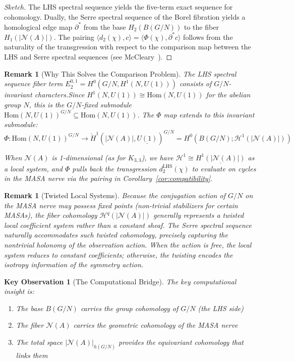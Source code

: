 \documentclass[11pt]{article}
\newtheorem{remark}[theorem]{Remark}
\newtheorem{keyobservation}[theorem]{Key Observation}
\begin{document}
\begin{proof}[Sketch]
The LHS spectral sequence yields the five-term exact sequence for cohomology. Dually, the Serre spectral sequence of the Borel fibration yields a homological edge map $\partial^*$ from the base $H_2(B(G/N))$ to the fiber $H_1(|\mathcal{N}(A)|)$. The pairing $\langle d_2(\chi), c \rangle = \langle \Phi(\chi), \partial^* c \rangle$ follows from the naturality of the transgression with respect to the comparison map between the LHS and Serre spectral sequences (see McCleary~\cite[Chapter 5]{McCleary2001}).
\end{proof}

\begin{remark}[Why This Solves the Comparison Problem]\label{rem:comparison-solved}
The LHS spectral sequence fiber term $E_2^{0,1} = H^0(G/N, H^1(N, U(1)))$ consists of $G/N$-invariant characters.\linebreak Since $H^1(N, U(1)) \cong \mathrm{Hom}(N, U(1))$ for the abelian group $N$, this is the $G/N$-fixed submodule $\mathrm{Hom}(N, U(1))^{G/N} \subseteq \mathrm{Hom}(N, U(1))$. The $\Phi$ map extends to this invariant submodule:
\[
\Phi: \mathrm{Hom}(N, U(1))^{G/N} \longrightarrow \check{H}^1(|\mathcal{N}(A)|, \underline{U(1)})^{G/N} = H^0(B(G/N); \mathcal{H}^1(|\mathcal{N}(A)|))
\]

When $\mathcal{N}(A)$ is 1-dimensional (as for $K_{3,3}$), we have $\mathcal{H}^1 \cong \underline{H^1(|\mathcal{N}(A)|)}$ as a local system, and $\Phi$ pulls back the transgression $d_2^{\text{LHS}}(\chi)$ to evaluate on cycles in the MASA nerve via the pairing in Corollary~\ref{cor:compatibility}.
\end{remark}

\begin{remark}[Twisted Local Systems]\label{rem:twisted}
Because the conjugation action of $G/N$ on the MASA nerve may possess fixed points (non-trivial stabilizers for certain MASAs), the fiber cohomology $\mathcal{H}^q(|\mathcal{N}(A)|)$ generally represents a twisted local coefficient system rather than a constant sheaf. The Serre spectral sequence naturally accommodates such twisted cohomology, precisely capturing the nontrivial holonomy of the observation action. When the action is free, the local system reduces to constant coefficients; otherwise, the twisting encodes the isotropy information of the symmetry action.
\end{remark}

\begin{keyobservation}[The Computational Bridge]\label{obs:computational}
The key computational insight is:
\begin{enumerate}
\item The base $B(G/N)$ carries the group cohomology of $G/N$ (the LHS side)
\item The fiber $\mathcal{N}(A)$ carries the geometric cohomology of the MASA nerve
\item The total space $|\mathcal{N}(A)|_{h(G/N)}$ provides the equivariant cohomology that links them
\end{enumerate}
\end{keyobservation}
\end{document}
